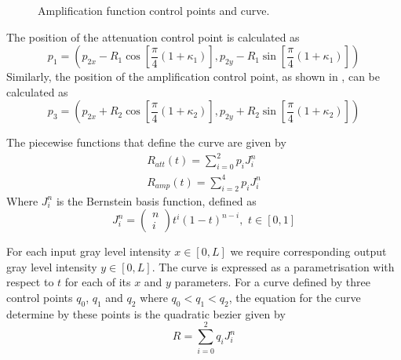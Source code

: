 \begin{definition}
	\begin{figure}[!t]
		\centering
		\caption{Amplification function control points and curve.}
		\label{fig:ampcalculation}
	\end{figure}

	The position of the attenuation control point is calculated as
	\begin{equation*}
		{p_1} = \left(
		p_{2x} - R_1\cos[\frac{\pi}{4}(1+\kappa_1)],
		p_{2y} - R_1\sin[\frac{\pi}{4}(1+\kappa_1)]
		\right)
	\end{equation*}
	Similarly, the position of the amplification control point, as shown in , can be calculated as
	\begin{equation*}
		{p_3} = \left(
		p_{2x} + R_2\cos[\frac{\pi}{4}(1+\kappa_2)],
		p_{2y} + R_2\sin[\frac{\pi}{4}(1+\kappa_2)]
		\right)
	\end{equation*}
	
	The piecewise functions that define the curve are given by	
	\begin{eqnarray}
		R_{att}(t) = \sum_{i=0}^2 p_i J_i^n \\
		R_{amp}(t) = \sum_{i=2}^4 p_i J_i^n
	\end{eqnarray}
	Where $J_i^n$ is the Bernstein basis function, defined as
	\begin{equation}
	J_i^n = \begin{pmatrix}
	n \\
	i
	\end{pmatrix}	
	t^i(1-t)^{n-i}, \,\, t \in [0,1]
	\label{eq:bernsteinbasis}
	\end{equation}
	
	For each input gray level intensity $x \in [0, L]$ we require corresponding output gray level intensity $y \in [0, L]$.
	The curve is expressed as a parametrisation with respect to $t$ for each of its $x$ and $y$ parameters.
	For a curve defined by three control points $q_0$, $q_1$ and $q_2$ where $q_0 < q_1 < q_2$, the equation for the curve determine by these points is the quadratic bezier given by
	\begin{equation}
		R = \sum_{i=0}^2 q_i J_i^n
	\end{equation}
	

\end{definition}
